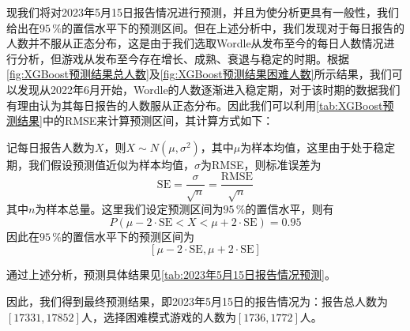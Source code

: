 \documentclass{MathModeling}
\begin{document}
现我们将对2023年5月15日报告情况进行预测，并且为使分析更具有一般性，我们给出在$95\,\%$的置信水平下的预测区间。但在上述分析中，我们发现对于每日报告的人数并不服从正态分布，这是由于我们选取Wordle从发布至今的每日人数情况进行分析，但游戏从发布至今存在增长、成熟、衰退与稳定的时期。根据\textcolor{blue}{\cref{fig:XGBoost预测结果总人数}}及\textcolor{blue}{\cref{fig:XGBoost预测结果困难人数}}所示结果，我们可以发现从2022年6月开始，Wordle的人数逐渐进入稳定期，对于该时期的数据我们有理由认为其每日报告的人数服从正态分布。因此我们可以利用\textcolor{blue}{\cref{tab:XGBoost预测结果}}中的RMSE来计算预测区间，其计算方式如下：

记每日报告人数为$X$，则$X\sim N(\mu,\sigma^2)$，其中$\mu$为样本均值，这里由于处于稳定期，我们假设预测值近似为样本均值，$\sigma$为RMSE，则标准误差为
\begin{equation}
	\text{SE}=\frac{\sigma}{\sqrt{n}}=\frac{\text{RMSE}}{\sqrt{n}}
\end{equation}
其中$n$为样本总量。这里我们设定预测区间为$95\,\%$的置信水平，则有
\begin{equation}
	P(\mu-2\cdot\text{SE} < X < \mu+2\cdot\text{SE})=0.95
\end{equation}
因此在$95\,\%$的置信水平下的预测区间为
\begin{equation}
	\left[\mu-2\cdot\text{SE},\mu+2\cdot\text{SE}\right]
\end{equation}

通过上述分析，预测具体结果见\textcolor{blue}{\cref{tab:2023年5月15日报告情况预测}}。
\begin{table}[H]
	\centering
	\caption{2023年5月15日报告情况预测结果}
	\label{tab:2023年5月15日报告情况预测}
\end{table}

因此，我们得到最终预测结果，即2023年5月15日的报告情况为：报告总人数为$\left[17331,17852\right]$人，选择困难模式游戏的人数为$\left[1736,1772\right]$人。
\end{document}
